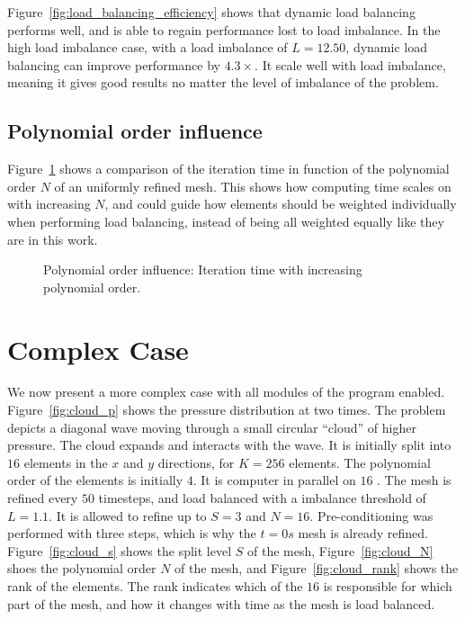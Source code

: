 Figure~\ref{fig:load_balancing_efficiency} shows that dynamic load balancing performs well, and is
able to regain performance lost to load imbalance. In the high load imbalance case, with a load
imbalance of \(L = 12.50\), dynamic load balancing can improve performance by \(4.3 \times \). It
scale well with load imbalance, meaning it gives good results no matter the level of imbalance of
the problem.

\subsection{Polynomial order influence}\label{subsection:results:load_balancing_performance:polynomial_order}

Figure~\ref{fig:N_influence} shows a comparison of the iteration time in function of the polynomial
order \(N\) of an uniformly refined mesh. This shows how computing time scales on
 with increasing \(N\), and could guide how elements should be weighted
individually when performing load balancing, instead of being all weighted equally like they are in
this work.

\begin{figure}[H]
	\centering
	
	\caption{Polynomial order influence: Iteration time with increasing polynomial order.}\label{fig:N_influence}
\end{figure}

\section{Complex Case}\label{section:results:complex_application}

We now present a more complex case with all modules of the program enabled. Figure~\ref{fig:cloud_p}
shows the pressure distribution at two times. The problem depicts a diagonal wave moving through a
small circular ``cloud'' of higher pressure. The cloud expands and interacts with the wave. It is
initially split into \(16\) elements in the \(x\) and \(y\) directions, for \(K = 256\) elements.
The polynomial order of the elements is initially \(4\). It is computer in parallel on \(16\)
. The mesh is refined every \(50\) timesteps, and load balanced with a imbalance
threshold of \(L = 1.1\). It is allowed to refine up to \(S = 3\) and \(N = 16\). Pre-conditioning
was performed with three steps, which is why the \(t = 0 s\) mesh is already refined.
Figure~\ref{fig:cloud_s} shows the split level \(S\) of the mesh, Figure~\ref{fig:cloud_N} shoes the
polynomial order \(N\) of the mesh, and Figure~\ref{fig:cloud_rank} shows the rank of the elements.
The rank indicates which of the \(16\)  is responsible for which part of the
mesh, and how it changes with time as the mesh is load balanced.

